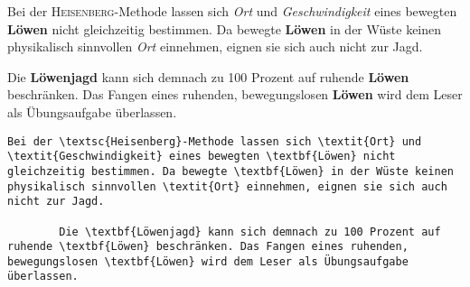 \begin{frame}[fragile]
	\Losung
	\begin{outputbox}
		Bei der \textsc{Heisenberg}-Methode lassen sich \textit{Ort} und \textit{Geschwindigkeit} eines bewegten \textbf{Löwen} nicht gleichzeitig bestimmen. Da bewegte \textbf{Löwen} in der Wüste keinen physikalisch sinnvollen \textit{Ort} einnehmen, eignen sie sich auch nicht zur Jagd.
		
		Die \textbf{Löwenjagd} kann sich demnach zu 100 Prozent auf ruhende \textbf{Löwen} beschränken. Das Fangen eines ruhenden, bewegungslosen \textbf{Löwen} wird dem Leser als Übungsaufgabe überlassen.
	\end{outputbox}

	\Code
	\begin{lstlisting}[breaklines=true,gobble=8]
		Bei der \textsc{Heisenberg}-Methode lassen sich \textit{Ort} und \textit{Geschwindigkeit} eines bewegten \textbf{Löwen} nicht gleichzeitig bestimmen. Da bewegte \textbf{Löwen} in der Wüste keinen physikalisch sinnvollen \textit{Ort} einnehmen, eignen sie sich auch nicht zur Jagd. 
		
		Die \textbf{Löwenjagd} kann sich demnach zu 100 Prozent auf ruhende \textbf{Löwen} beschränken. Das Fangen eines ruhenden, bewegungslosen \textbf{Löwen} wird dem Leser als Übungsaufgabe überlassen.
	\end{lstlisting}
\end{frame}
